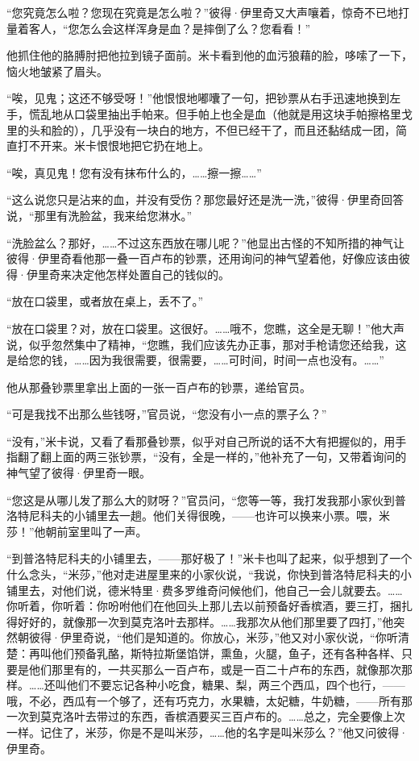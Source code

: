 \par “您究竟怎么啦？您现在究竟是怎么啦？”彼得·伊里奇又大声嚷着，惊奇不已地打量着客人，“您怎么会这样浑身是血？是摔倒了么？您看看！”
\par 他抓住他的胳膊肘把他拉到镜子面前。米卡看到他的血污狼藉的脸，哆嗦了一下，恼火地皱紧了眉头。
\par “唉，见鬼；这还不够受呀！”他恨恨地嘟囔了一句，把钞票从右手迅速地换到左手，慌乱地从口袋里抽出手帕来。但手帕上也全是血（他就是用这块手帕擦格里戈里的头和脸的），几乎没有一块白的地方，不但已经干了，而且还黏结成一团，简直打不开来。米卡恨恨地把它扔在地上。
\par “唉，真见鬼！您有没有抹布什么的，……擦一擦……”
\par “这么说您只是沾来的血，并没有受伤？那您最好还是洗一洗，”彼得·伊里奇回答说，“那里有洗脸盆，我来给您淋水。”
\par “洗脸盆么？那好，……不过这东西放在哪儿呢？”他显出古怪的不知所措的神气让彼得·伊里奇看他那一叠一百卢布的钞票，还用询问的神气望着他，好像应该由彼得·伊里奇来决定他怎样处置自己的钱似的。
\par “放在口袋里，或者放在桌上，丢不了。”
\par “放在口袋里？对，放在口袋里。这很好。……哦不，您瞧，这全是无聊！”他大声说，似乎忽然集中了精神，“您瞧，我们应该先办正事，那对手枪请您还给我，这是给您的钱，……因为我很需要，很需要，……可时间，时间一点也没有。……”
\par 他从那叠钞票里拿出上面的一张一百卢布的钞票，递给官员。
\par “可是我找不出那么些钱呀，”官员说，“您没有小一点的票子么？”
\par “没有，”米卡说，又看了看那叠钞票，似乎对自己所说的话不大有把握似的，用手指翻了翻上面的两三张钞票，“没有，全是一样的，”他补充了一句，又带着询问的神气望了彼得·伊里奇一眼。
\par “您这是从哪儿发了那么大的财呀？”官员问，“您等一等，我打发我那小家伙到普洛特尼科夫的小铺里去一趟。他们关得很晚，——也许可以换来小票。喂，米莎！”他朝前室里叫了一声。
\par “到普洛特尼科夫的小铺里去，——那好极了！”米卡也叫了起来，似乎想到了一个什么念头，“米莎，”他对走进屋里来的小家伙说，“我说，你快到普洛特尼科夫的小铺里去，对他们说，德米特里·费多罗维奇问候他们，他自己一会儿就要去。……你听着，你听着：你吩咐他们在他回头上那儿去以前预备好香槟酒，要三打，捆扎得好好的，就像那一次到莫克洛叶去那样。……我那次从他们那里要了四打，”他突然朝彼得·伊里奇说，“他们是知道的。你放心，米莎，”他又对小家伙说，“你听清楚：再叫他们预备乳酪，斯特拉斯堡馅饼，熏鱼，火腿，鱼子，还有各种各样、只要是他们那里有的，一共买那么一百卢布，或是一百二十卢布的东西，就像那次那样。……还叫他们不要忘记各种小吃食，糖果、梨，两三个西瓜，四个也行，——哦，不必，西瓜有一个够了，还有巧克力，水果糖，太妃糖，牛奶糖，——所有那一次到莫克洛叶去带过的东西，香槟酒要买三百卢布的。……总之，完全要像上次一样。记住了，米莎，你是不是叫米莎，……他的名字是叫米莎么？”他又问彼得·伊里奇。
